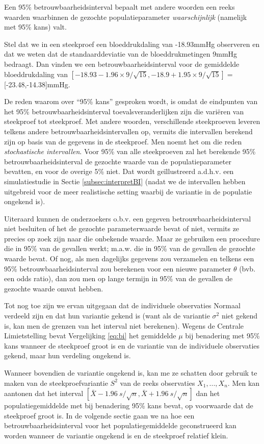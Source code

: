 \documentclass[
  12pt,dutch,coursenotes]{book}
\theoremstyle{definition}
\theoremstyle{definition}
\theoremstyle{definition}
\theoremstyle{remark}
\begin{document}
Een 95\% betrouwbaarheidsinterval bepaalt met andere woorden een reeks
waarden waarbinnen de gezochte populatieparameter \emph{waarschijnlijk}
(namelijk met 95\% kans) valt.

Stel dat we in een steekproef een bloeddrukdaling van -18.93mmHg observeren en dat we weten dat de standaarddeviatie van de bloeddrukmetingen 9mmHg bedraagt. Dan vinden we een betrouwbaarheidsinterval voor de gemiddelde bloeddrukdaling van
\(\left[-18.93-1.96\times 9/\sqrt{15},-18.9+1.95\times 9/\sqrt{15}\right]=\){[}-23.48,-14.38{]}mmHg.

De reden waarom over ``95\% kans'' gesproken wordt, is omdat de eindpunten van
het 95\% betrouwbaarheidsinterval toevalsveranderlijken zijn die variëren
van steekproef tot steekproef. Met andere woorden, verschillende
steekproeven leveren telkens andere betrouwbaarheidsintervallen op, vermits
die intervallen berekend zijn op basis van de gegevens in de steekproef. Men
noemt het om die reden \emph{stochastische intervallen}.
Voor 95\% van alle steekproeven zal het berekende 95\% betrouwbaarheidsinterval de
gezochte waarde van de populatieparameter bevatten, en voor de overige 5\%
niet. Dat wordt geïllustreerd a.d.h.v. een simulatiestudie in Sectie \ref{subsec:interpretBI} (nadat we de intervallen hebben uitgebreid voor de meer realistische setting waarbij de variantie in de populatie ongekend is).

Uiteraard kunnen de onderzoekers o.b.v. een gegeven betrouwbaarheidsinterval
niet besluiten of het de gezochte parameterwaarde bevat of niet, vermits ze
precies op zoek zijn naar die onbekende waarde. Maar ze gebruiken een
procedure die in 95\% van de gevallen werkt; m.a.w. die in 95\% van de
gevallen de gezochte waarde bevat. Of nog, als men dagelijks gegevens zou
verzamelen en telkens een 95\% betrouwbaarheidsinterval zou berekenen voor
een nieuwe parameter \(\theta\) (bvb. een odds ratio), dan zou men op lange termijn in 95\% van de gevallen de gezochte waarde omvat hebben.

Tot nog toe zijn we ervan uitgegaan dat de individuele observaties Normaal verdeeld zijn en dat hun variantie gekend is (want als de variantie \(\sigma^2\) niet gekend is, kan men de grenzen van het interval niet berekenen).
Wegens de Centrale Limietstelling bevat Vergelijking \eqref{eq:bi} het gemiddelde \(\mu\)
bij benadering met 95\% kans wanneer de steekproef groot is en de variantie
van de individuele observaties gekend, maar hun verdeling ongekend is.

Wanneer bovendien de variantie ongekend is, kan me ze schatten door gebruik te maken van de
steekproefvariantie \(S^2\) van de reeks observaties \(X_1,...,X_n\). Men kan aantonen dat
het interval \([\bar{X} - 1.96 \ s/\sqrt{n} , \bar{X} + 1.96 \ s/\sqrt{n} ]\)
dan het populatiegemiddelde met bij benadering 95\% kans bevat, op voorwaarde
dat de steekproef groot is. In de volgende sectie gaan we na hoe een
betrouwbaarheidsinterval voor het populatiegemiddelde geconstrueerd kan
worden wanneer de variantie ongekend is en de steekproef relatief klein.
\end{document}
